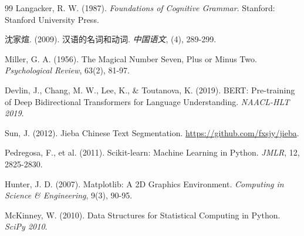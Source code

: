 \documentclass[a4paper,12pt]{article}
\begin{document}
\begin{thebibliography}{99}
 Langacker, R. W. (1987). \textit{Foundations of Cognitive Grammar}. Stanford: Stanford University Press.

 沈家煊. (2009). 汉语的名词和动词. \textit{中国语文}, (4), 289-299.

 Miller, G. A. (1956). The Magical Number Seven, Plus or Minus Two. \textit{Psychological Review}, 63(2), 81-97.

 Devlin, J., Chang, M. W., Lee, K., \& Toutanova, K. (2019). BERT: Pre-training of Deep Bidirectional Transformers for Language Understanding. \textit{NAACL-HLT 2019}.

 Sun, J. (2012). Jieba Chinese Text Segmentation. \url{https://github.com/fxsjy/jieba}.

 Pedregosa, F., et al. (2011). Scikit-learn: Machine Learning in Python. \textit{JMLR}, 12, 2825-2830.

 Hunter, J. D. (2007). Matplotlib: A 2D Graphics Environment. \textit{Computing in Science \& Engineering}, 9(3), 90-95.

 McKinney, W. (2010). Data Structures for Statistical Computing in Python. \textit{SciPy 2010}.

\end{thebibliography}
\end{document}
